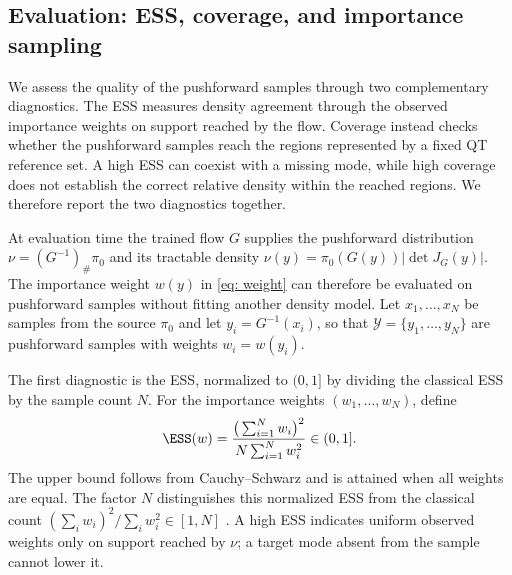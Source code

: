 \documentclass{article}
\begin{document}
\subsection{Evaluation: ESS, coverage, and importance sampling}
\label{subsec: eval}

We assess the quality of the pushforward samples through two complementary diagnostics. The ESS measures density agreement through the observed importance weights on support reached by the flow. Coverage instead checks whether the pushforward samples reach the regions represented by a fixed QT reference set. A high ESS can coexist with a missing mode, while high coverage does not establish the correct relative density within the reached regions. We therefore report the two diagnostics together.

At evaluation time the trained flow $G$ supplies the pushforward distribution $\nu=(G^{-1})_{\#}\pi_0$ and its tractable density $\nu(y)=\pi_0(G(y))|\det J_G(y)|$. The importance weight $w(y)$ in \eqref{eq: weight} can therefore be evaluated on pushforward samples without fitting another density model. Let $x_1,\dots,x_N$ be samples from the source $\pi_0$ and let $y_i = G^{-1}(x_i)$, so that $\mathcal Y=\{y_1,\dots,y_N\}$ are pushforward samples with weights $w_i=w(y_i)$.

The first diagnostic is the ESS, normalized to $(0,1]$ by dividing the classical ESS by the sample count $N$. For the importance weights $(w_1,\dots,w_N)$, define
\begin{equation}
    \ESS(w) = \frac{\big(\sum_{i=1}^{N} w_i\big)^2}{N \sum_{i=1}^{N} w_i^2} \in (0,1].
    \label{eq: ESS}
\end{equation}
The upper bound follows from Cauchy--Schwarz and is attained when all weights are equal. The factor $N$ distinguishes this normalized ESS from the classical count $(\sum_iw_i)^2/\sum_iw_i^2\in[1,N]$ \citep{martino2017rethinking}. A high ESS indicates uniform observed weights only on support reached by $\nu$; a target mode absent from the sample cannot lower it.
\end{document}
